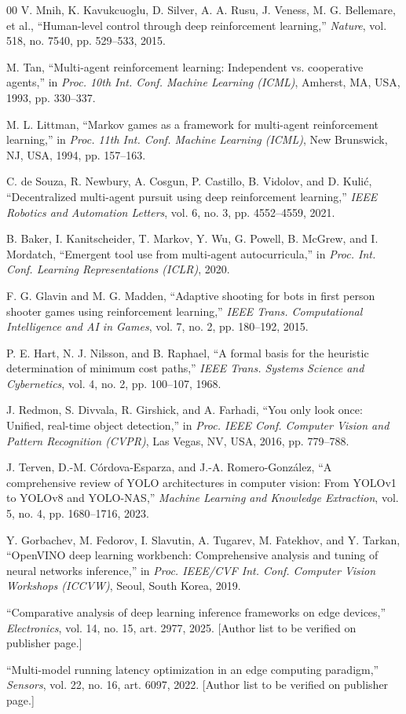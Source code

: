 \documentclass[conference]{IEEEtran}
\begin{document}
\begin{thebibliography}{00}
 V. Mnih, K. Kavukcuoglu, D. Silver, A. A. Rusu, J. Veness, M. G. Bellemare, et al., ``Human-level control through deep reinforcement learning,'' \emph{Nature}, vol. 518, no. 7540, pp. 529--533, 2015.

 M. Tan, ``Multi-agent reinforcement learning: Independent vs. cooperative agents,'' in \emph{Proc. 10th Int. Conf. Machine Learning (ICML)}, Amherst, MA, USA, 1993, pp. 330--337.

 M. L. Littman, ``Markov games as a framework for multi-agent reinforcement learning,'' in \emph{Proc. 11th Int. Conf. Machine Learning (ICML)}, New Brunswick, NJ, USA, 1994, pp. 157--163.

 C. de Souza, R. Newbury, A. Cosgun, P. Castillo, B. Vidolov, and D. Kuli\'c, ``Decentralized multi-agent pursuit using deep reinforcement learning,'' \emph{IEEE Robotics and Automation Letters}, vol. 6, no. 3, pp. 4552--4559, 2021.

 B. Baker, I. Kanitscheider, T. Markov, Y. Wu, G. Powell, B. McGrew, and I. Mordatch, ``Emergent tool use from multi-agent autocurricula,'' in \emph{Proc. Int. Conf. Learning Representations (ICLR)}, 2020.

 F. G. Glavin and M. G. Madden, ``Adaptive shooting for bots in first person shooter games using reinforcement learning,'' \emph{IEEE Trans. Computational Intelligence and AI in Games}, vol. 7, no. 2, pp. 180--192, 2015.

 P. E. Hart, N. J. Nilsson, and B. Raphael, ``A formal basis for the heuristic determination of minimum cost paths,'' \emph{IEEE Trans. Systems Science and Cybernetics}, vol. 4, no. 2, pp. 100--107, 1968.

 J. Redmon, S. Divvala, R. Girshick, and A. Farhadi, ``You only look once: Unified, real-time object detection,'' in \emph{Proc. IEEE Conf. Computer Vision and Pattern Recognition (CVPR)}, Las Vegas, NV, USA, 2016, pp. 779--788.

 J. Terven, D.-M. C\'ordova-Esparza, and J.-A. Romero-Gonz\'alez, ``A comprehensive review of YOLO architectures in computer vision: From YOLOv1 to YOLOv8 and YOLO-NAS,'' \emph{Machine Learning and Knowledge Extraction}, vol. 5, no. 4, pp. 1680--1716, 2023.

 Y. Gorbachev, M. Fedorov, I. Slavutin, A. Tugarev, M. Fatekhov, and Y. Tarkan, ``OpenVINO deep learning workbench: Comprehensive analysis and tuning of neural networks inference,'' in \emph{Proc. IEEE/CVF Int. Conf. Computer Vision Workshops (ICCVW)}, Seoul, South Korea, 2019.

 ``Comparative analysis of deep learning inference frameworks on edge devices,'' \emph{Electronics}, vol. 14, no. 15, art. 2977, 2025. [Author list to be verified on publisher page.]

 ``Multi-model running latency optimization in an edge computing paradigm,'' \emph{Sensors}, vol. 22, no. 16, art. 6097, 2022. [Author list to be verified on publisher page.]

\end{thebibliography}
\end{document}
